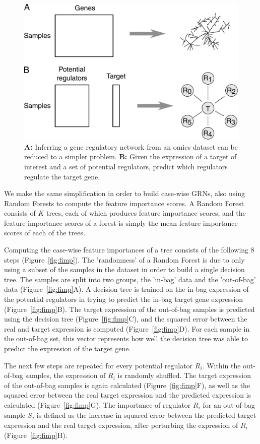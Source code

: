 \begin{figure}[htb!]
	\centering
	\includegraphics[width=.6\linewidth]{fig/methodology/simplify.pdf} 
	\caption{
		\textbf{A:} Inferring a gene regulatory network from an omics dataset can be reduced to a simpler problem. 
		\textbf{B:} Given the expression of a target of interest and a set of potential regulators, predict which regulators regulate the target gene.
	}
	\label{fig:simplify}
\end{figure}

We make the same simplification in order to build case-wise GRNs, also using Random Forests to compute the feature importance scores. A Random Forest consists of $K$ trees, each of which produces feature importance scores, and the feature importance scores of a forest is simply the mean feature importance scores of each of the trees. 

Computing the case-wise feature importances of a tree consists of the following 8 steps (Figure~\ref{fig:fimp}).
The 'randomness' of a Random Forest is due to only using a subset of the samples in the dataset in order to build a single decision tree. The samples are split into two groups, the 'in-bag' data and the 'out-of-bag' data (Figure~\ref{fig:fimp}A). A decision tree \cite{breiman_classificationregressiontrees_1984} is trained on the in-bag expression of the potential regulators in trying to predict the in-bag target gene expression (Figure~\ref{fig:fimp}B). The target expression of the out-of-bag samples is predicted using the decision tree (Figure~\ref{fig:fimp}C), and the squared error between the real and target expression is computed (Figure~\ref{fig:fimp}D). For each sample in the out-of-bag set, this vector represents how well the decision tree was able to predict the expression of the target gene.

The next few steps are repeated for every potential regulator $R_i$. Within the out-of-bag samples, the expression of $R_i$ is randomly shuffled. The target expression of the out-of-bag samples is again calculated (Figure~\ref{fig:fimp}F), as well as the squared error between the real target expression and the predicted expression is calculated (Figure~\ref{fig:fimp}G). The importance of regulator $R_i$ for an out-of-bag sample $S_j$ is defined as the increase in squared error between the predicted target expression and the real target expression, after perturbing the expression of $R_i$ (Figure~\ref{fig:fimp}H). 

